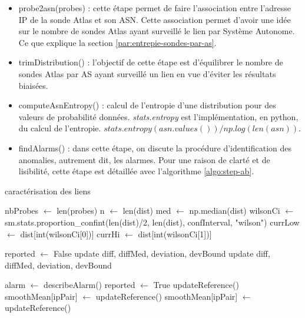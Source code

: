 \begin{itemize}
	\item probe2asn(probes) : cette étape permet de faire l'association entre l'adresse IP de la sonde Atlas et son ASN. Cette association permet d'avoir une idée sur le nombre de sondes Atlas ayant surveillé le lien par Système Autonome. Ce que explique la section \ref{par:entrepie-sondes-par-as}.
	
	\item  trimDistribution() : l'objectif de cette étape est d'équilibrer le nombre de sondes Atlas par AS ayant surveillé un lien en vue d'éviter les résultats biaisées. 
	
	\item computeAsnEntropy() : calcul de l'entropie d'une distribution pour des valeurs de probabilité données. \textit{stats.entropy} est l'implémentation, en python, du calcul de l'entropie.  
	$ stats.entropy(asn.values())/np.log(len(asn)) $.
	
	\item findAlarms() : dans cette étape, on discute la procédure d'identification des anomalies, autrement dit, les alarmes. Pour une raison de clarté et de lisibilité,  cette étape est détaillée avec l'algorithme 	  	\ref{algo:step-ab}.
	
\end{itemize}
\newpage
  \begin{algorithm} [H] 	\caption{caractérisation des liens }
\begin{algorithmic}[1]
	\label{algo:step-outlierDetection}
	\State  nbProbes  $\leftarrow $ len(probes)
	\State n $\leftarrow $  len(dist) 
	\State med $\leftarrow $ np.median(dist)
	\State  wilsonCi $\leftarrow $  sm.stats.proportion\_confint(len(dist)/2, len(dist), confInterval, "wilson")
	\State currLow $\leftarrow $ dist[int(wilsonCi[0])] \label{lst:line:currL}
	\State currHi $\leftarrow $ dist[int(wilsonCi[1])]  \label{lst:line:currHi}
	
    \State reported $\leftarrow $ False
	 
		           \State update  diff, diffMed, deviation, devBound 
		        \Else
		           \State update  diff, diffMed, deviation, devBound 
		        \EndIf
		        
              \State alarm $\leftarrow $ describeAlarm()
              \State reported $\leftarrow $ True
		    \EndIf
		\EndIf
		\State updateReference()
	\Else {}
			\State  smoothMean[ipPair] $\leftarrow $ updateReference()
		\Else
		    \State  smoothMean[ipPair] $\leftarrow $ updateReference()
		\EndIf
	\EndIf
\end{algorithmic}
  	\label{algo:step-ab}
  \end{algorithm}
  
